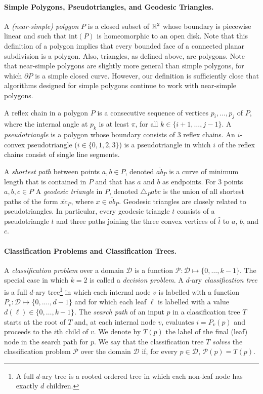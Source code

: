\documentclass[lotsofwhite]{patmorin}
\newcommand{\boundary}{\partial}
\newcommand{\interior}{\mathrm{int}}
\newcommand{\z}[1]{{\hat{#1}}}
\begin{document}
\paragraph{Simple Polygons, Pseudotriangles, and Geodesic Triangles.}

A \emph{(near-simple) polygon} $P$ is a closed subset of $\mathbb{R}^2$ whose
boundary is piecewise linear and such that $\interior(P)$ is
homeomorphic to an open disk.  Note that this definition of a polygon
implies that every bounded face of a connected planar subdivision is a
polygon.  Also, triangles, as defined above, are polygons.  Note that
near-simple polygons are slightly more general than simple polygons,
for which $\boundary P$ is a simple closed curve.  However, our
definition is sufficiently close that algorithms designed for simple
polygons continue to work with near-simple polygons.

A reflex chain in a polygon $P$ is a consecutive sequence of vertices
$p_i,\ldots,p_j$ of $P$, where the internal angle at $p_k$ is at least
$\pi$, for all $k\in\{i+1,\ldots,j-1\}$. A \emph{pseudotriangle} is a
polygon whose boundary consists of 3 reflex chains.  An $i$-convex
pseudotriangle ($i\in\{0,1,2,3\}$) is a pseudotriangle in which $i$ of
the reflex chains consist of single line segments.

A \emph{shortest path} between points $a,b\in P$, denoted
$\overline{ab}_P$ is a curve of minimum length that is contained in
$P$ and that has $a$ and $b$ as endpoints.  For 3 points $a,b,c\in P$
A \emph{geodesic triangle} in $P$, denoted $\triangle_P abc$ is the
union of all shortest paths of the form $\overline{xc}_P$, where
$x\in\overline{ab}_P$.  Geodesic triangles are closely related to
pseudotriangles.  In particular, every geodesic triangle $t$ consists
of a pseudotriangle $\z t$ and three paths joining the three convex
vertices of $\z t$ to $a$, $b$, and $c$.

\paragraph{Classification Problems and Classification Trees.}

A \emph{classification problem} over a domain $\mathcal{D}$ is a
function $\mathcal{P}:\mathcal{D}\mapsto \{0,\ldots,k-1\}$.  The
special case in which $k=2$ is called a \emph{decision problem}.  A
$d$-ary \emph{classification tree} is a full $d$-ary tree\footnote{A
full $d$-ary tree is a rooted ordered tree in which each non-leaf node
has exactly $d$ children.} in which each internal node $v$ is labelled
with a function $P_v:\mathcal{D}\mapsto\{0,.\ldots,d-1\}$ and for
which each leaf $\ell$ is labelled with a value
$d(\ell)\in\{0,\ldots,k-1\}$. The \emph{search path} of an input $p$
in a classification tree $T$ starts at the root of $T$ and, at each
internal node $v$, evaluates $i=P_v(p)$ and proceeds to the $i$th
child of $v$.  We denote by $T(p)$ the label of the final (leaf) node
in the search path for $p$.  We say that the classification tree $T$
\emph{solves} the classification problem $\mathcal{P}$ over the domain
$\mathcal{D}$ if, for every $p\in \mathcal{D}$, $\mathcal{P}(p)=T(p)$.
\end{document}
